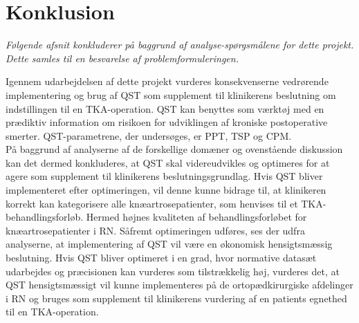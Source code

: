 \newpage\section{Konklusion}
\textit{Følgende afsnit konkluderer på baggrund af analyse-spørgsmålene for dette projekt. Dette samles til en besvarelse af problemformuleringen.}

Igennem udarbejdelsen af dette projekt vurderes konsekvenserne vedrørende implementering og brug af QST som supplement til klinikerens beslutning om indstillingen til en TKA-operation. QST kan benyttes som værktøj med en prædiktiv information om risikoen for udviklingen af kroniske postoperative smerter. QST-parametrene, der undersøges, er PPT, TSP og CPM.\\
På baggrund af analyserne af de forskellige domæner og ovenstående diskussion kan det dermed konkluderes, at QST skal videreudvikles og optimeres for at agere som supplement til klinikerens beslutningsgrundlag. Hvis QST bliver implementeret efter optimeringen, vil denne kunne bidrage til, at klinikeren korrekt kan kategorisere alle knæartrosepatienter, som henvises til et TKA-behandlingsforløb. Hermed højnes kvaliteten af behandlingsforløbet for knæartrosepatienter i RN. Såfremt optimeringen udføres, ses der udfra analyserne, at implementering af QST vil være en økonomisk hensigtsmæssig beslutning. Hvis QST bliver optimeret i en grad, hvor normative datasæt udarbejdes og præcisionen kan vurderes som tilstrækkelig høj, vurderes det, at QST hensigtsmæssigt vil kunne implementeres på de ortopædkirurgiske afdelinger i RN og bruges som supplement til klinikerens vurdering af en patients egnethed til en TKA-operation.

